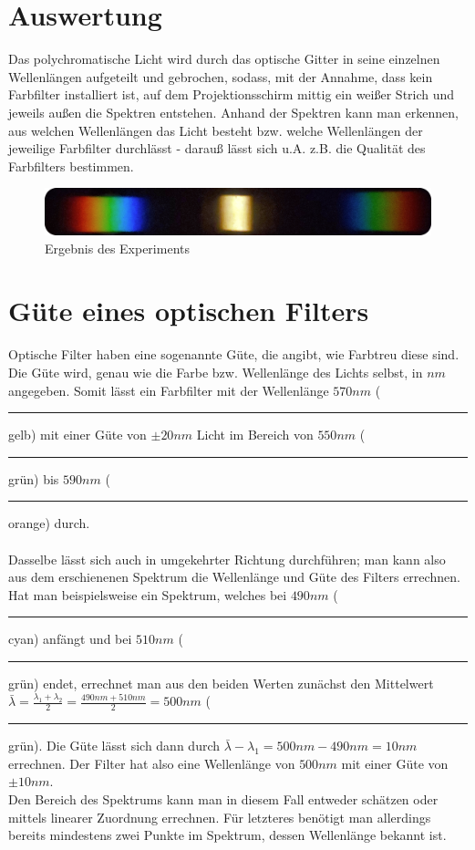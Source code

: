 \documentclass[12pt, a4paper]{article}
\newcommand\crule[3][black]{\textcolor{#1}{\rule{#2}{#3}}}
\begin{document}
\section{Auswertung}
Das polychromatische Licht wird durch das optische Gitter in seine einzelnen Wellenl\"angen aufgeteilt und gebrochen, sodass, mit der Annahme, dass kein Farbfilter installiert ist,
auf dem Projektionsschirm mittig ein weißer Strich und jeweils außen die Spektren entstehen.
Anhand der Spektren kann man erkennen, aus welchen Wellenl\"angen das Licht besteht bzw.
welche Wellenl\"angen der jeweilige Farbfilter durchl\"asst - darauß l\"asst sich u.A. z.B. die Qualit\"at des Farbfilters bestimmen.

\begin{figure}[h]
    \includegraphics[width=\textwidth]{Spektrum_Foto.png}
    \caption[Ergebnis]{Ergebnis des Experiments}
\end{figure}

\section{G\"ute eines optischen Filters}
Optische Filter haben eine sogenannte G\"ute, die angibt, wie Farbtreu diese sind.
Die Güte wird, genau wie die Farbe bzw. Wellenl\"ange des Lichts selbst, in $nm$ angegeben.
Somit l\"asst ein Farbfilter mit der Wellenl\"ange $570nm$ (\crule[yellow570]{3mm}{3mm} gelb) mit einer Güte von $\pm 20nm$ Licht im Bereich
von $550nm$ (\crule[green550]{3mm}{3mm} gr\"un) bis $590nm$ (\crule[orange590]{3mm}{3mm} orange) durch.\\
\\
Dasselbe l\"asst sich auch in umgekehrter Richtung durchf\"uhren; man kann also aus dem erschienenen
Spektrum die Wellenl\"ange und G\"ute des Filters errechnen.
Hat man beispielsweise ein Spektrum, welches bei $490nm$ (\crule[cyan490]{3mm}{3mm} cyan) anf\"angt und bei $510nm$ (\crule[green510]{3mm}{3mm} gr\"un) endet,
errechnet man aus den beiden Werten zun\"achst den Mittelwert $\bar\lambda=\frac{\lambda_1+\lambda_2}{2}=\frac{490nm + 510nm}{2}=500nm$ (\crule[green500]{3mm}{3mm} gr\"un).
Die G\"ute l\"asst sich dann durch $\bar\lambda - \lambda_1 = 500nm - 490nm = 10nm$ errechnen.
Der Filter hat also eine Wellenl\"ange von $500nm$ mit einer Güte von $\pm 10nm$.\\
Den Bereich des Spektrums kann man in diesem Fall entweder sch\"atzen oder mittels linearer Zuordnung errechnen. Für letzteres ben\"otigt man allerdings
bereits mindestens zwei Punkte im Spektrum, dessen Wellenl\"ange bekannt ist.
\end{document}

